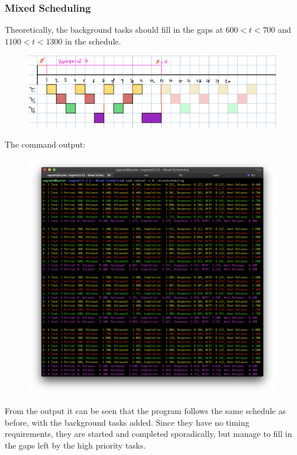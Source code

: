 \setcounter{section}{3}
\setcounter{subsection}{3}
\setcounter{subsubsection}{4}

\subsubsection{Mixed Scheduling}
Theoretically, the background tasks should fill in the gaps at $600 < t < 700$ and $1100 < t < 1300$ in the schedule.
\begin{figure}[H]
    \includegraphics[width=\linewidth]{background-tasks-schedule}
\end{figure}

The command output:
\begin{figure}[H]
    \includegraphics[width=\linewidth]{mixed-scheduling-output}
\end{figure}

From the output it can be seen that the program follows the same schedule as before, with the background tasks added. Since they have no timing requirements, they are started and completed sporadically, but manage to fill in the gaps left by the high priority tasks.

